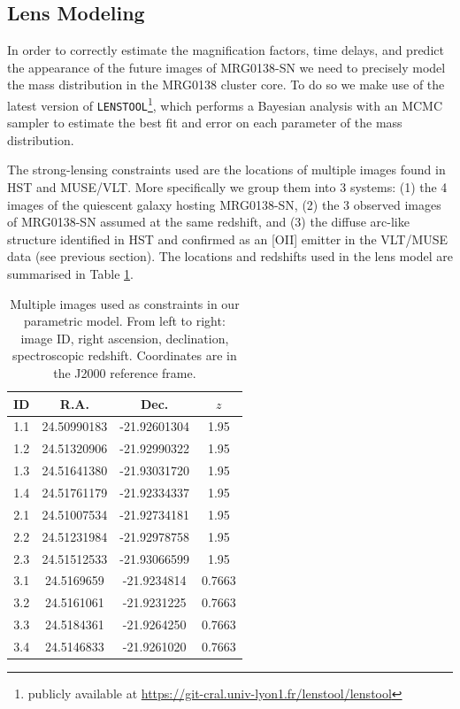 \documentclass[12pt,dvipsnames]{article}
\def\lenstool{{\tt LENSTOOL}\xspace}
\begin{document}
\subsection*{Lens Modeling}

In order to correctly estimate the magnification factors, time delays, and predict the appearance of the future images of MRG0138-SN we need to precisely model the mass distribution in the MRG0138 cluster core. To do so we make use of the latest version of \lenstool \cite{jullo_bayesian_2007}\footnote{publicly available at \url{ https://git-cral.univ-lyon1.fr/lenstool/lenstool}}, which performs a Bayesian analysis with an MCMC sampler to estimate the best fit and error on each parameter of the mass distribution. 

The strong-lensing constraints used are the locations of multiple images found in HST and MUSE/VLT. More specifically we group them into 3 systems: (1) the 4 images of the quiescent galaxy hosting MRG0138-SN, (2) the 3 observed images of MRG0138-SN assumed at the same redshift, and (3) the diffuse arc-like structure identified in HST and confirmed as an [OII] emitter in the VLT/MUSE data (see previous section). The locations and redshifts used in the lens model are summarised in Table \ref{tab:mulimages}.

\begin{table}[]
    \centering
    \begin{tabular}{c|c|c|c}
     ID &   R.A. & Dec. & $z$ \\
     \midrule
1.1 & 24.50990183 & -21.92601304 & 1.95 \\
1.2 & 24.51320906 & -21.92990322 & 1.95 \\
1.3 & 24.51641380 & -21.93031720 & 1.95 \\
1.4 & 24.51761179 & -21.92334337 & 1.95 \\
2.1 & 24.51007534 & -21.92734181 & 1.95 \\
2.2 & 24.51231984 & -21.92978758 & 1.95 \\
2.3 & 24.51512533 & -21.93066599 & 1.95 \\
3.1 & 24.5169659 & -21.9234814 & 0.7663 \\
3.2 & 24.5161061 & -21.9231225 & 0.7663 \\
3.3 & 24.5184361 & -21.9264250 & 0.7663 \\
3.4 & 24.5146833 & -21.9261020 & 0.7663 \\
    \end{tabular}
    \caption{Multiple images used as constraints in our parametric model. From left to right: image ID, right ascension, declination, spectroscopic redshift.  Coordinates are in the J2000 reference frame.}
    \label{tab:mulimages}
\end{table}
\end{document}
